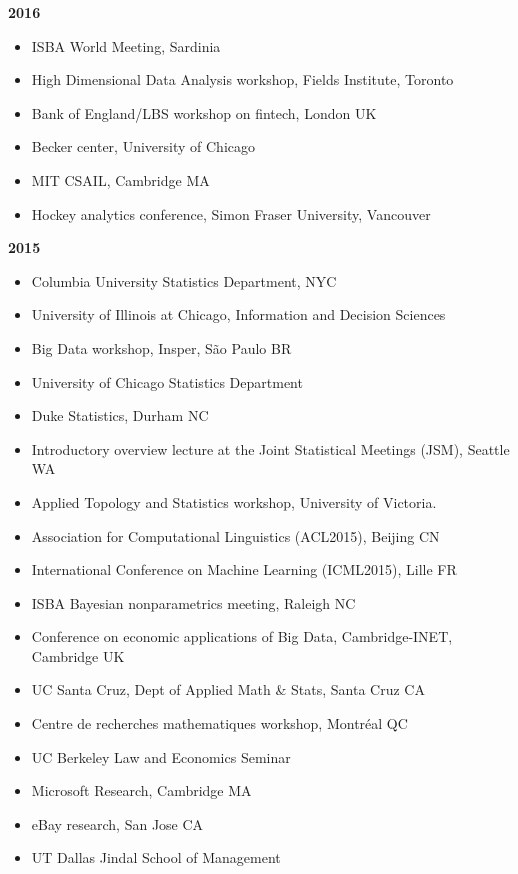 \documentclass[margin,line]{res}
\begin{document}
\begin{resume}
{\bf 2016}
\begin{itemize}
\item ISBA World Meeting, Sardinia
\item High Dimensional Data Analysis workshop, Fields Institute, Toronto
\item Bank of England/LBS workshop on fintech, London UK
\item Becker center, University of Chicago
\item MIT CSAIL, Cambridge MA
\item Hockey analytics conference, Simon Fraser University, Vancouver
\end{itemize}

{\bf 2015}
\begin{itemize}
\item Columbia University Statistics Department, NYC
\item University of Illinois at Chicago, Information and Decision Sciences 
\item Big Data workshop, Insper, S\~ao Paulo BR
\item University of Chicago Statistics Department
\item Duke Statistics, Durham NC
\item Introductory overview lecture at the Joint Statistical Meetings (JSM), Seattle WA
\item Applied Topology and Statistics workshop, University of Victoria.
\item Association for Computational Linguistics (ACL2015), Beijing CN
\item International Conference on Machine Learning (ICML2015), Lille FR
\item ISBA Bayesian nonparametrics meeting, Raleigh NC
\item Conference on economic applications of Big Data, Cambridge-INET, Cambridge UK
\item UC Santa Cruz, Dept of Applied Math \& Stats, Santa Cruz CA
\item Centre de recherches mathematiques workshop, Montr\'eal QC
\item UC Berkeley Law and Economics Seminar
\item Microsoft Research, Cambridge MA
\item eBay research, San Jose CA
\item UT Dallas Jindal School of Management
\end{itemize}



\end{resume}
\end{document}
